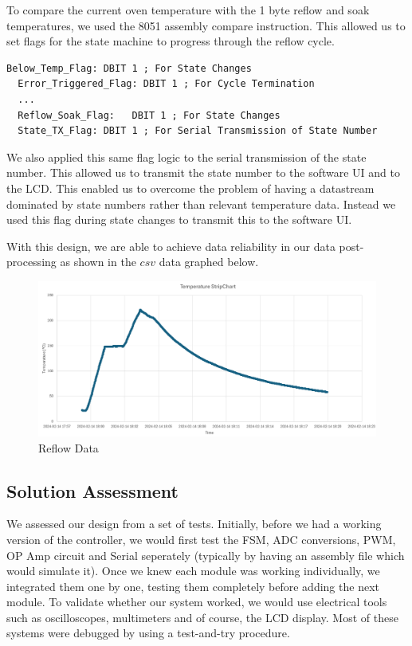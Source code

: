 \documentclass{article}
\begin{document}
\noindent To compare the current oven temperature with the 1 byte reflow and soak temperatures, we used the 8051 assembly compare instruction. This allowed us to set flags for the state machine to progress through the reflow cycle.

\begin{lstlisting}[language={[x86masm]Assembler}]
  Below_Temp_Flag: DBIT 1 ; For State Changes
  Error_Triggered_Flag: DBIT 1 ; For Cycle Termination
  ...
  Reflow_Soak_Flag:   DBIT 1 ; For State Changes
  State_TX_Flag: DBIT 1 ; For Serial Transmission of State Number
\end{lstlisting}

\noindent We also applied this same flag logic to the serial transmission of the state number. This allowed us to transmit the state number to the software UI and to the LCD.
This enabled us to overcome the problem of having a datastream dominated by state numbers rather than relevant temperature data. Instead we used this flag during state changes to transmit this to the software UI.

With this design, we are able to achieve data reliability in our data post-processing as shown in the $csv$ data graphed below.

\begin{figure}[H]
  \centering
  \includegraphics[width=1.0\linewidth]{Figures/Reflow_Data.png}
  \caption{Reflow Data}
  \label{fig:Reflow Data}
\end{figure}

\subsection{Solution Assessment}

\noindent We assessed our design from a set of tests. Initially, before we had a working version of the controller, we would first test the FSM, ADC conversions, PWM, OP Amp circuit and Serial seperately (typically by having an assembly file which would simulate it). Once we knew each module was working individually, we integrated them one by one, testing them completely before adding the next module. To validate whether our system worked, we would use electrical tools such as oscilloscopes, multimeters and of course, the LCD display. Most of these systems were debugged by using a test-and-try procedure.
\end{document}
